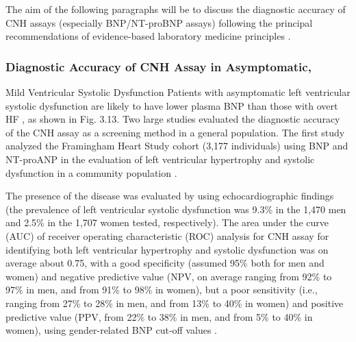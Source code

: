 \documentclass[14pt,a4paper,onecolumn]{extarticle}
\begin{document}
The aim of the following paragraphs will be to discuss the diagnostic accuracy of
CNH assays (especially BNP/NT-proBNP assays) following the principal recommendations of evidence-based laboratory medicine principles \citep{bib371} \citep{bib3106} \citep{bib3107}.


\subsubsection{ Diagnostic Accuracy of CNH Assay in Asymptomatic,}

Mild Ventricular Systolic Dysfunction
Patients with asymptomatic left ventricular systolic dysfunction are likely to have lower
plasma BNP than those with overt HF \citep{bib32} \citep{bib33} \citep{bib34} \citep{bib35} \citep{bib334} \citep{bib335} \citep{bib362} \citep{bib363} \citep{bib364} \citep{bib365} \citep{bib366} \citep{bib372}, as shown in Fig. 3.13.
Two large studies \citep{bib39} \citep{bib366} evaluated the diagnostic accuracy of the CNH assay as a
screening method in a general population. The first study analyzed the Framingham
Heart Study cohort (3,177 individuals) using BNP and NT-proANP in the evaluation of
left ventricular hypertrophy and systolic dysfunction in a community population \citep{bib39}.

The presence of the disease was evaluated by using echocardiographic findings (the
prevalence of left ventricular systolic dysfunction was 9.3\% in the 1,470 men and 2.5\%
in the 1,707 women tested, respectively). The area under the curve (AUC) of receiver
operating characteristic (ROC) analysis for CNH assay for identifying both left ventricular hypertrophy and systolic dysfunction was on average about 0.75, with a good specificity (assumed 95\% both for men and women) and negative predictive value (NPV, on
average ranging from 92\% to 97\% in men, and from 91\% to 98\% in women), but a poor
sensitivity (i.e., ranging from 27\% to 28\% in men, and from 13\% to 40\% in women) and
positive predictive value (PPV, from 22\% to 38\% in men, and from 5\% to 40\% in women),
using gender-related BNP cut-off values \citep{bib39}.
\end{document}
